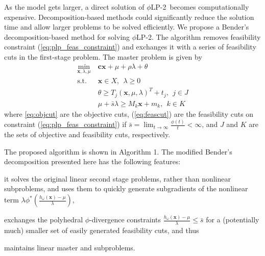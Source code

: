 \documentclass[opre,nonblindrev]{informs3} %
\newcommand{\x}{\mathbf{x}}
\renewcommand{\c}{\mathbf{c}}
\newcommand{\st}{\mbox{s.t.}}
\newcommand{\plp}{$\phi$LP-2}
\begin{document}
As the model gets larger, a direct solution of \plp\ becomes computationally expensive. 
Decomposition-based methods could significantly reduce the solution time and allow larger problems to be solved efficiently. We propose a Bender's decomposition-based method for solving \plp.
The algorithm removes feasibility constraint (\ref{eq:plp_feas_constraint})  and exchanges it with a series of feasibility cuts in the first-stage problem.
The master problem is given by
\begin{align}
	\min_{\x,\lambda,\mu} \ & \c\x + \mu + \rho \lambda + \theta \label{eq:master_problem}\\
	\st \ & \x \in X,\ \ \lambda \geq 0 \nonumber  \\
	& \theta \geq T_j (\x,\mu,\lambda)^T + t_j, \ \  j \in J  \label{eq:objcut} \\
	& \mu + \bar{s}\lambda \geq M_k \x + m_k, \ \ k \in K \label{eq:feascut} 
\end{align}
where \eqref{eq:objcut} are the objective cuts, (\ref{eq:feascut}) are the feasibility cuts on constraint (\ref{eq:plp_feas_constraint}) if $\bar{s} = \lim_{t \rightarrow \infty} \frac{\phi(t)}{t} < \infty$, and $J$ and $K$ are the sets of objective and feasibility cuts, respectively.

The proposed algorithm is shown in Algorithm 1. 
The modified Bender's decomposition presented here has the following features:
\begin{inparaenum}
	\item it solves the original linear second stage problems, rather than nonlinear subproblems, and uses them to quickly generate subgradients of the nonlinear term $\lambda \phi^*\left(\tfrac{h_\omega(\x) - \mu}{\lambda}\right)$, 
	\item exchanges the polyhedral $\phi$-divergence constraints $\tfrac{h_\omega(\x) - \mu}{\lambda} \leq \bar{s}$ for a (potentially much) smaller set of easily generated feasibility cuts, and thus
	\item  maintains linear master and subproblems.\medskip
\end{inparaenum}
\end{document}
